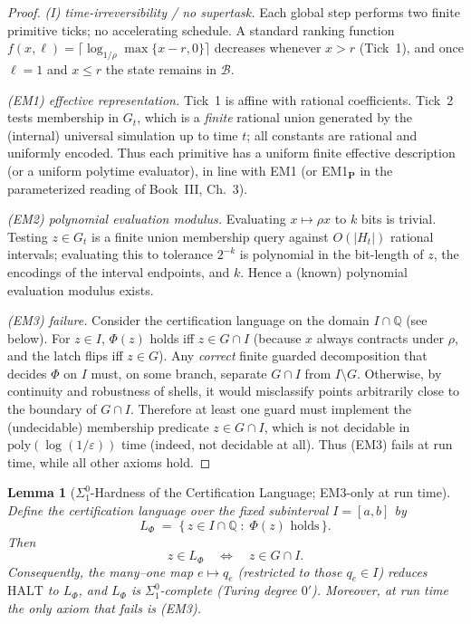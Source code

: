 \documentclass[12pt]{article}
\theoremstyle{definition}
\theoremstyle{plain}
\newtheorem{lemma}{Lemma}[section]
\begin{document}
\begin{proof}
\emph{(I) time-irreversibility / no supertask.}
Each global step performs two finite primitive ticks; no accelerating schedule. A standard ranking function \(f(x,\ell)=\lceil\log_{1/\rho}\max\{x-r,0\}\rceil\) decreases whenever \(x>r\) (Tick~1), and once \(\ell=1\) and \(x\le r\) the state remains in \(\mathcal B\).

\emph{(EM1) effective representation.}
Tick~1 is affine with rational coefficients. Tick~2 tests membership in \(G_t\), which is a \emph{finite}
rational union generated by the (internal) universal simulation up to time \(t\); all constants are rational and uniformly encoded. Thus each primitive has a uniform finite effective description (or a uniform polytime evaluator), in line with EM1 (or EM1\(_{\mathbf P}\) in the parameterized reading of Book~III, Ch.~3).

\emph{(EM2) polynomial evaluation modulus.}
Evaluating \(x\mapsto \rho x\) to \(k\) bits is trivial. Testing \(z\in G_t\) is a finite union membership
query against \(O(|H_t|)\) rational intervals; evaluating this to tolerance \(2^{-k}\) is polynomial in the bit-length of \(z\), the encodings of the interval endpoints, and \(k\). Hence a (known) polynomial evaluation modulus exists.

\emph{(EM3) failure.}
Consider the certification language on the domain \(I\cap\mathbb Q\) (see below). For \(z\in I\),
\(\Phi(z)\) holds iff \(z\in G\cap I\) (because \(x\) always contracts under \(\rho\), and the latch flips
iff \(z\in G\)). Any \emph{correct} finite guarded decomposition that decides \(\Phi\) on \(I\) must, on some branch, separate \(G\cap I\) from \(I\setminus G\). Otherwise, by continuity and robustness of shells, it would misclassify points arbitrarily close to the boundary of \(G\cap I\). Therefore at least one guard must implement the (undecidable) membership predicate \(z\in G\cap I\), which is not decidable in \(\mathrm{poly}(\log(1/\varepsilon))\) time (indeed, not decidable at all). Thus \textup{(EM3)} fails at run time, while all other axioms hold.
\end{proof}

\begin{lemma}[\texorpdfstring{$\Sigma^0_1$}{Sigma^0\_1}-Hardness of the Certification Language; EM3-only at run time]
\label{lem:EM3-violation-hardness}
Define the certification language over the fixed subinterval \(I=[a,b]\) by
\[
L_\Phi \;=\; \{\, z\in I\cap\mathbb Q \;:\; \Phi(z)\text{ holds}\,\}.
\]
Then
\[
z\in L_\Phi \quad\Longleftrightarrow\quad z\in G\cap I.
\]
Consequently, the many–one map \(e\mapsto q_e\) (restricted to those \(q_e\in I\)) reduces
\(\mathrm{HALT}\) to \(L_\Phi\), and \(L_\Phi\) is \(\Sigma^0_1\)-complete (Turing degree \(0'\)).
Moreover, at run time the only axiom that fails is \textup{(EM3)}.
\end{lemma}
\end{document}
